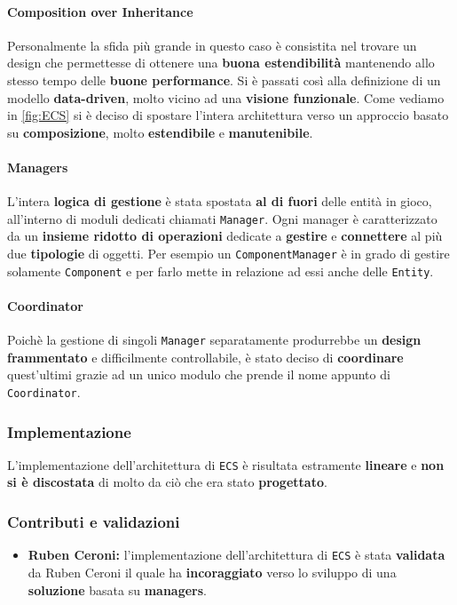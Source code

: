 \paragraph{Composition over Inheritance}
Personalmente la sfida più grande in questo caso è consistita nel trovare un design che permettesse di ottenere una \textbf{buona estendibilità} mantenendo allo stesso tempo delle \textbf{buone performance}. Si è passati così alla definizione di un modello \textbf{data-driven}, molto vicino ad una \textbf{visione funzionale}. Come vediamo in \ref{fig:ECS} si è deciso di spostare l'intera architettura verso un approccio basato su \textbf{composizione}, molto \textbf{estendibile} e \textbf{manutenibile}. 

\paragraph{Managers}
L'intera \textbf{logica di gestione} è stata spostata \textbf{al di fuori} delle entità in gioco, all'interno di moduli dedicati chiamati \texttt{Manager}. Ogni manager è caratterizzato da un \textbf{insieme ridotto di operazioni} dedicate a \textbf{gestire} e \textbf{connettere} al più due \textbf{tipologie} di oggetti. Per esempio un \texttt{ComponentManager} è in grado di gestire solamente \texttt{Component} e per farlo mette in relazione ad essi anche delle \texttt{Entity}.

\paragraph{Coordinator}
Poichè la gestione di singoli \texttt{Manager} separatamente produrrebbe un \textbf{design frammentato} e difficilmente controllabile, è stato deciso di \textbf{coordinare} quest'ultimi grazie ad un unico modulo che prende il nome appunto di\\ \texttt{Coordinator}.

\subsubsection{Implementazione}
L'implementazione dell'architettura di \texttt{ECS} è risultata estramente \textbf{lineare} e \textbf{non si è discostata} di molto da ciò che era stato \textbf{progettato}.

\subsubsection{Contributi e validazioni}
\begin{itemize}
	\item{\textbf{Ruben Ceroni:}} l'implementazione dell'architettura di \texttt{ECS} è stata \textbf{validata} da Ruben Ceroni il quale ha \textbf{incoraggiato} verso lo sviluppo di una \textbf{soluzione} basata su \textbf{managers}.
\end{itemize}

